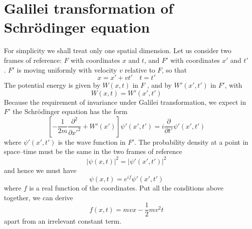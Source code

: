 \section{Galilei transformation of Schr\"{o}dinger equation}
For simplicity we shall treat only one spatial dimension. Let us consider two frames of reference: $F$ with coordinates $x$ and $t$, and $F'$ with coordinates $x'$ and $t'$. $F'$ is moving uniformly with velocity $v$ relative to $F$, so that
\[x = x' + vt' \quad t=t'\]
The potential energy is given by $W(x,t)$ in $F$ , and by $W'(x',t')$ in $F'$, with
\[W(x,t) = W'(x',t')\]
Because the requirement of invariance under Galilei transformation, we expect in $F'$ the  Schr\"{o}dinger equation has the form
\[ \left[- \frac{1}{2m} \frac{\partial^2}{\partial x'^2} + W'(x') \right] \psi'(x',t') = i\frac{\partial}{\partial t'}\psi'(x',t')\]
where $\psi'(x',t')$ is the wave function in $F'$.
The probability density at a point in space–time must be the same in the two frames of reference
\[|\psi(x,t)|^2 = |\psi'(x',t')|^2\]
and hence we must have
\[\psi(x,t) = e^{if}\psi'(x',t')\]
where $f$ is a real function of the coordinates.
Put all the conditions above together, we can derive
\[f(x,t) = mvx - \frac{1}{2} mv^2t\]
apart from an irrelevant constant term.

